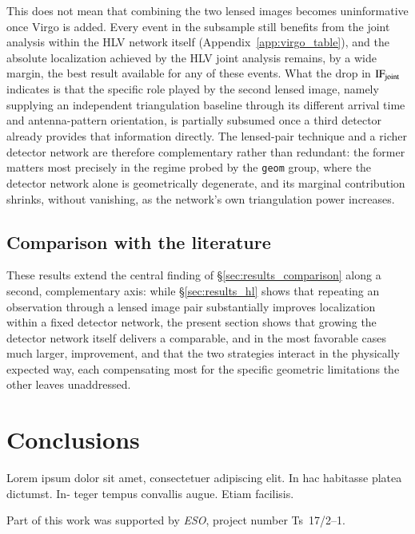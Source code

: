 \documentclass{aa}
\begin{document}
This does not mean that combining the two lensed images becomes
uninformative once Virgo is added. Every event in the subsample still
benefits from the joint analysis within the HLV network itself
(Appendix~\ref{app:virgo_table}), and the absolute localization achieved by
the HLV joint analysis remains, by a wide margin, the best result available
for any of these events. What the drop in $\mathrm{IF}_{\rm joint}$
indicates is that the specific role played by the second lensed image,
namely supplying an independent triangulation baseline through its
different arrival time and antenna-pattern orientation, is partially
subsumed once a third detector already provides that information directly.
The lensed-pair technique and a richer detector network are therefore
complementary rather than redundant: the former matters most precisely in
the regime probed by the \texttt{geom} group, where the detector network
alone is geometrically degenerate, and its marginal contribution shrinks,
without vanishing, as the network's own triangulation power increases.

\subsection{Comparison with the literature}
\label{sec:virgo_comparison}

These results extend the central finding of \S\ref{sec:results_comparison}
along a second, complementary axis: while \S\ref{sec:results_hl} shows that
repeating an observation through a lensed image pair substantially improves
localization within a fixed detector network, the present section shows
that growing the detector network itself delivers a comparable, and in the
most favorable cases much larger, improvement, and that the two strategies
interact in the physically expected way, each compensating most for the
specific geometric limitations the other leaves unaddressed.




\section{Conclusions}
Lorem ipsum dolor sit amet,
consectetuer adipiscing elit. In hac habitasse platea dictumst. In-
teger tempus convallis augue. Etiam facilisis.

\begin{acknowledgements}
      Part of this work was supported by \emph{ESO}, project
      number Ts~17/2--1.
\end{acknowledgements}
\end{document}
